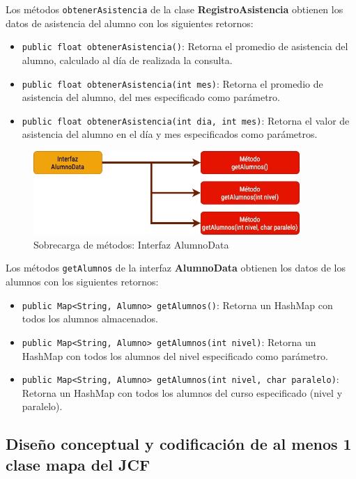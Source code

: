Los métodos \texttt{obtenerAsistencia} de la clase \textbf{RegistroAsistencia} obtienen los datos de asistencia del alumno con los siguientes retornos:

\begin{itemize}
    \item \texttt{public float obtenerAsistencia()}: Retorna el promedio de asistencia del alumno, calculado al día de realizada la consulta.
    \item \texttt{public float obtenerAsistencia(int mes)}: Retorna el promedio de asistencia del alumno, del mes especificado como parámetro.
    \item \texttt{public float obtenerAsistencia(int dia, int mes)}: Retorna el valor de asistencia del alumno en el día y mes especificados como parámetros.
\end{itemize}

\begin{figure}[h]
    \centering
    \includegraphics[width=0.9\textwidth]{contents/img/img6}
    \caption{Sobrecarga de métodos: Interfaz AlumnoData}
    \label{fig:img6}
\end{figure}

Los métodos \texttt{getAlumnos} de la interfaz \textbf{AlumnoData} obtienen los datos de los alumnos con los siguientes retornos:

\begin{itemize}
    \item \texttt{public Map<String, Alumno> getAlumnos()}: Retorna un HashMap con todos los alumnos almacenados.
    \item \texttt{public Map<String, Alumno> getAlumnos(int nivel)}: Retorna un HashMap con todos los alumnos del nivel especificado como parámetro.
    \item \texttt{public Map<String, Alumno> getAlumnos(int nivel, char paralelo)}: Retorna un HashMap con todos los alumnos del curso especificado (nivel y paralelo).
\end{itemize}

\subsection{Diseño conceptual y codificación de al menos 1 clase mapa del JCF}

